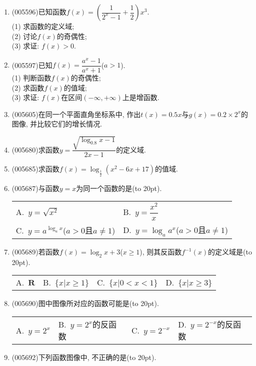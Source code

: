 \documentclass[10pt,a4paper]{article}
\newcommand{\bracket}[1]{(\hbox to #1pt{})}
\newcommand{\twoch}[4]{\par\begin{tabular}{p{.46\textwidth}p{.46\textwidth}}
A.~#1& B.~#2\\
C.~#3& D.~#4
\end{tabular}}
\newcommand{\fourch}[4]{\par\begin{tabular}{p{.23\textwidth}p{.23\textwidth}p{.23\textwidth}p{.23\textwidth}}
A.~#1 &B.~#2& C.~#3& D.~#4
\end{tabular}}
\begin{document}
\begin{enumerate}[1.]
\item {\tiny (005596)}已知函数$f(x)=(\dfrac 1{2^x-1}+\dfrac 12)x^3$.\\
(1) 求函数的定义域;\\
(2) 讨论$f(x)$的奇偶性;\\
(3) 求证: $f(x)>0$.
\item {\tiny (005597)}已知$f(x)=\dfrac{a^x-1}{a^x+1}$($a>1$).\\
(1) 判断函数$f(x)$的奇偶性;\\
(2) 求函数$f(x)$的值域;\\
(3) 求证: $f(x)$在区间$(-\infty ,+\infty)$上是增函数.
\item {\tiny (005605)}在同一个平面直角坐标系中, 作出$t(x)=0.5x$与$g(x)=0.2\times 2^x$的图像, 并比较它们的增长情况.
\item {\tiny (005680)}求函数$y=\dfrac{\sqrt {\log_{0.8}x-1}}{2x-1}$的定义域.
\item {\tiny (005685)}求函数$f(x)=\log_{\frac 12}(x^2-6x+17)$的值域.
\item {\tiny (005687)}与函数$y=x$为同一个函数的是\bracket{20}.
\twoch{$y=\sqrt {x^2}$}{$y=\dfrac{x^2}x$}{$y=a^{\log_ax}$($a>0$且$a\ne 1$)}{$y=\log_aa^x$($a>0$且$a\ne 1$)}
\item {\tiny (005689)}若函数$f(x)=\log_2x+3$($x\ge 1$), 则其反函数$f^{-1}(x)$的定义域是\bracket{20}.
\fourch{$\mathbf{R}$}{$\{x|x\ge 1\}$}{$\{x|0<x<1\}$}{$\{x|x\ge 3\}$}
\item {\tiny (005690)}图中图像所对应的函数可能是\bracket{20}.
\begin{center}
\end{center}
\fourch{$y=2^x$}{$y=2^x$的反函数}{$y=2^{-x}$}{$y=2^{-x}$的反函数}
\item {\tiny (005692)}下列函数图像中, 不正确的是\bracket{20}.
\begin{center}
\end{center}
\end{enumerate}
\end{document}
